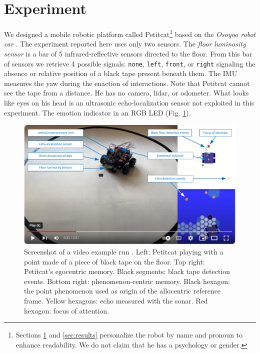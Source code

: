 \documentclass[runningheads]{llncs}
\begin{document}
\section{Experiment}
\label{sec:expe}

We designed a mobile robotic platform called Petitcat\footnote{Sections \ref{sec:expe} and \ref{sec:results} personalize the robot by name and pronoun to enhance readability. We do not claim that he has a psychology or gender.} based on the \textit{Osoyoo robot car} \cite{osoyoo_robot_car}.
The experiment reported here uses only two sensors.
The \textit{floor luminosity sensor} is a bar of 5 infrared-reflective sensors directed to the floor.
From this bar of sensors we retrieve 4 possible signals:  \texttt{none},  \texttt{left},  \texttt{front}, or \texttt{right} signaling the absence or relative position of a black tape present beneath them.  
The IMU measures the yaw during the enaction of interactions.
Note that Petitcat cannot see the tape from a distance. 
He has no camera, lidar, or odometer.
What looks like eyes on his head is an ultrasonic echo-localization sensor not exploited in this experiment. 
The emotion indicator in an RGB LED (Fig. \ref{fig:video}). 

\begin{figure}
	\includegraphics[width=\textwidth]{Figure_video.pdf}
	\caption{Screenshot of a video example run \cite{georgeon_petitcat_2024}.
		Left: Petitcat playing with a point made of a piece of black tape on the floor.
		Top right: Petitcat's egocentric memory. Black segments: black tape detection events. 
		Bottom right: phenomenon-centric memory. 
		Black hexagon: the point phenomenon used as origin of the allocentric reference frame. 
		Yellow hexagons: echo measured with the sonar. Red hexagon: focus of attention.} \label{fig:video}
\end{figure}
\end{document}
